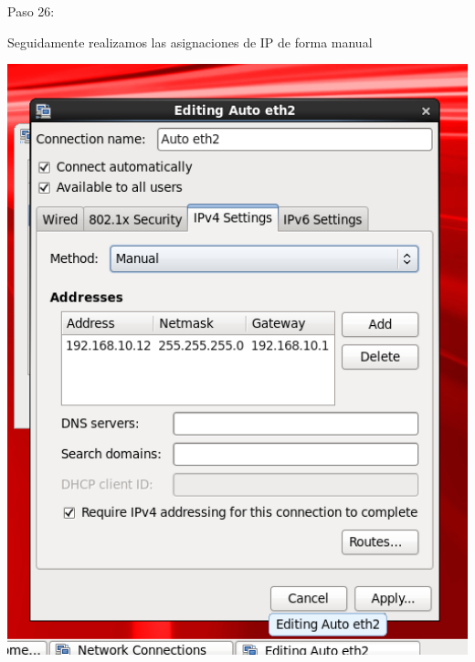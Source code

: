 \begin{itemize}
\begin{center}
    Paso 26:
\end{center}

    Seguidamente realizamos las asignaciones de IP de forma manual\\
	\begin{center}
	\includegraphics[width=15cm]{./Imagenes/imagen26} 
	\end{center}

\end{itemize} 

